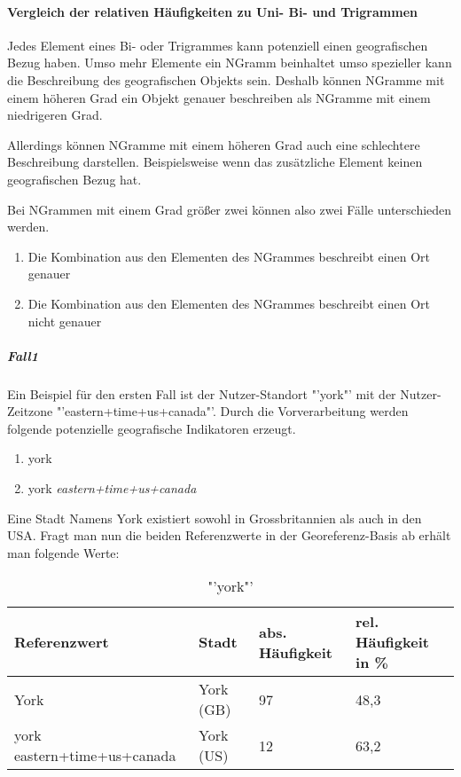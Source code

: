 	
				\paragraph{Vergleich der relativen Häufigkeiten zu Uni- Bi- und Trigrammen}

					Jedes Element eines Bi- oder Trigrammes kann potenziell einen geografischen Bezug haben. 
					Umso mehr Elemente ein NGramm beinhaltet umso spezieller kann die Beschreibung des geografischen Objekts sein.
					Deshalb können NGramme mit einem höheren Grad ein Objekt genauer beschreiben als NGramme mit einem niedrigeren Grad.

					Allerdings können NGramme mit einem höheren Grad auch eine schlechtere Beschreibung darstellen. 
					Beispielsweise wenn das zusätzliche Element keinen geografischen Bezug hat.

					Bei NGrammen mit einem Grad größer zwei können also zwei Fälle unterschieden werden.

					\begin{enumerate}
						\item Die Kombination aus den Elementen des NGrammes beschreibt einen Ort genauer
						\item Die Kombination aus den Elementen des NGrammes beschreibt einen Ort nicht genauer
					\end{enumerate}

					\subparagraph{Fall1} 

						Ein Beispiel für den ersten Fall ist der Nutzer-Standort "'york"' mit der Nutzer-Zeitzone "'eastern+time+us+canada"'. 
						Durch die Vorverarbeitung werden folgende potenzielle geografische Indikatoren erzeugt.
						\begin{enumerate}		
							\item york
							\item york \textit{eastern+time+us+canada}
						\end{enumerate}		

						Eine Stadt Namens York existiert sowohl in Grossbritannien als auch in den USA.
						Fragt man nun die beiden Referenzwerte in der Georeferenz-Basis ab erhält man folgende Werte:

							\begin{table}[h]
								\centering
									\caption{"'york"'}
									\label{tab:york}
									\begin{tabular}{|l|l|l|l|}
									\hline
									Referenzwert 				& Stadt  	& abs. Häufigkeit & rel. Häufigkeit in \% \\ \hline \hline
									York          				& York (GB) & 97              & 48,3       \\ \hline
									york eastern+time+us+canada & York (US) & 12              & 63,2        \\ \hline
									\end{tabular}
							\end{table}

